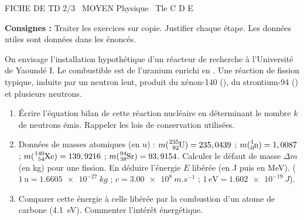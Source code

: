 \documentclass[11pt]{article}
\begin{document}
\begin{tcolorbox}[enhanced,colback=popink,colframe=popink,arc=10pt,boxrule=0pt,left=12pt,right=12pt,top=9pt,bottom=9pt]
{\color{white}\popxbold\small FICHE DE TD 2/3 \textbullet\ MOYEN \hfill Physique \textbullet\ Tle C D E\par}
\end{tcolorbox}
\vspace{4pt}
\noindent\textbf{Consignes :} Traiter les exercices sur copie. Justifier chaque étape. Les données utiles sont données dans les énoncés.\\

\begin{exercice}
On envisage l'installation hypothétique d'un réacteur de recherche à l'Université de Yaoundé I. Le combustible est de l'uranium enrichi en . Une réaction de fission typique, induite par un neutron lent, produit du xénon-140 (), du strontium-94 () et plusieurs neutrons.
\begin{enumerate}
    \item Écrire l'équation bilan de cette réaction nucléaire en déterminant le nombre $k$ de neutrons émis. Rappeler les lois de conservation utilisées.
    \item Données de masses atomiques (en u) : $m(\ce{^{235}_{92}U}) = 235,0439$ ; $m(\ce{^{1}_{0}n}) = 1,0087$ ; $m(\ce{^{140}_{54}Xe}) = 139,9216$ ; $m(\ce{^{94}_{38}Sr}) = 93,9154$.
        Calculer le défaut de masse $\Delta m$ (en kg) pour une fission. En déduire l'énergie $E$ libérée (en J puis en MeV). ($1\,\text{u} = \SI{1,6605e-27}{kg}$ ; $c = \SI{3,00e8}{m.s^{-1}}$ ; $1\,\text{eV} = \SI{1,602e-19}{J}$).
    \item Comparer cette énergie à celle libérée par la combustion d'un atome de carbone (\SI{4,1}{eV}). Commenter l'intérêt énergétique.
\end{enumerate}
\end{exercice}
\end{document}
